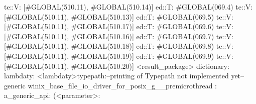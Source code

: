                      te::V:
                     [#GLOBAL(510.11), #GLOBAL(510.14)]
                    ed::T: #GLOBAL(069.4)
                     te::V:
                     [#GLOBAL(510.11), #GLOBAL(510.13)]
                    ed::T: #GLOBAL(069.5)
                     te::V:
                     [#GLOBAL(510.11), #GLOBAL(510.17)]
                    ed::T: #GLOBAL(069.6)
                     te::V:
                     [#GLOBAL(510.11), #GLOBAL(510.16)]
                    ed::T: #GLOBAL(069.7)
                     te::V:
                     [#GLOBAL(510.11), #GLOBAL(510.18)]
                    ed::T: #GLOBAL(069.8)
                     te::V:
                     [#GLOBAL(510.11), #GLOBAL(510.19)]
                    ed::T: #GLOBAL(069.9)
                     te::V:
                     [#GLOBAL(510.11), #GLOBAL(510.20)]
         <result_package>
dictionary:
lambdaty:
  <lambdaty>typepath:--printing of Typepath not implemented yet--
generic winix_base_file_io_driver_for_posix_g__premicrothread
:
a_generic_api:
(<parameter>:
